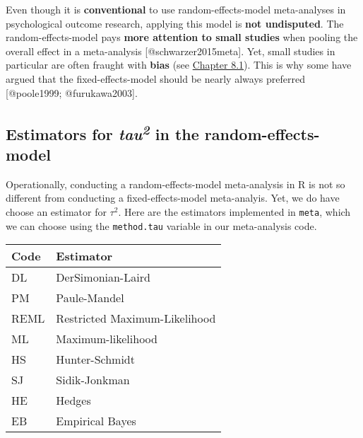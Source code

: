 \documentclass[]{book}
\theoremstyle{definition}
\theoremstyle{definition}
\theoremstyle{definition}
\theoremstyle{remark}
\begin{document}
\begin{rmdachtung}
Even though it is \textbf{conventional} to use random-effects-model
meta-analyses in psychological outcome research, applying this model is
\textbf{not undisputed}. The random-effects-model pays \textbf{more
attention to small studies} when pooling the overall effect in a
meta-analysis {[}@schwarzer2015meta{]}. Yet, small studies in particular
are often fraught with \textbf{bias} (see
\protect\hyperlink{smallstudyeffects}{Chapter 8.1}). This is why some
have argued that the fixed-effects-model should be nearly always
preferred {[}@poole1999; @furukawa2003{]}.
\end{rmdachtung}

\subsection{\texorpdfstring{Estimators for \emph{tau\textsuperscript{2}}
in the
random-effects-model}{Estimators for tau2 in the random-effects-model}}\label{tau2}

Operationally, conducting a random-effects-model meta-analysis in R is
not so different from conducting a fixed-effects-model meta-analyis.
Yet, we do have choose an estimator for \(\tau^{2}\). Here are the
estimators implemented in \texttt{meta}, which we can choose using the
\texttt{method.tau} variable in our meta-analysis code.

\begin{tabular}{l|l}
\hline
Code & Estimator\\
\hline
DL & DerSimonian-Laird\\
\hline
PM & Paule-Mandel\\
\hline
REML & Restricted Maximum-Likelihood\\
\hline
ML & Maximum-likelihood\\
\hline
HS & Hunter-Schmidt\\
\hline
SJ & Sidik-Jonkman\\
\hline
HE & Hedges\\
\hline
EB & Empirical Bayes\\
\hline
\end{tabular}
\end{document}
